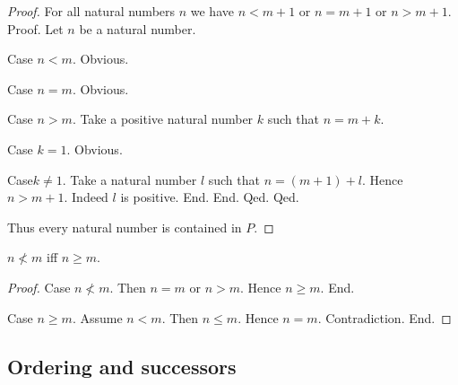\documentclass[../../arithmetic.ftl.tex]{subfiles}
\begin{document}
\begin{forthel}
\begin{proof}
        For all natural numbers $n$ we have $n < m + 1$ or $n = m + 1$ or $n > m + 1$. \\
        Proof.
          Let $n$ be a natural number.

          Case $n < m$. Obvious.

          Case $n = m$. Obvious.

          Case $n > m$.
            Take a positive natural number $k$ such that $n = m + k$.

            Case $k = 1$. Obvious.

            Case$k \neq 1$.
              Take a natural number $l$ such that $n = (m + 1) + l$.
              Hence $n > m + 1$.
              Indeed $l$ is positive.
            End.
          End.
        Qed.
      Qed.

      Thus every natural number is contained in $P$.
    \end{proof}


    \begin{proposition}\label{Arithmetic_02_01_112345}
      $n \nless m$ iff $n \geq m$.
    \end{proposition}
    \begin{proof}
      Case $n \nless m$.
        Then $n = m$ or $n > m$.
        Hence $n \geq m$.
      End.

      Case $n \geq m$.
        Assume $n < m$.
        Then $n \leq m$.
        Hence $n = m$.
        Contradiction.
      End.
    \end{proof}
  \end{forthel}


  \subsection{Ordering and successors}
\end{document}
